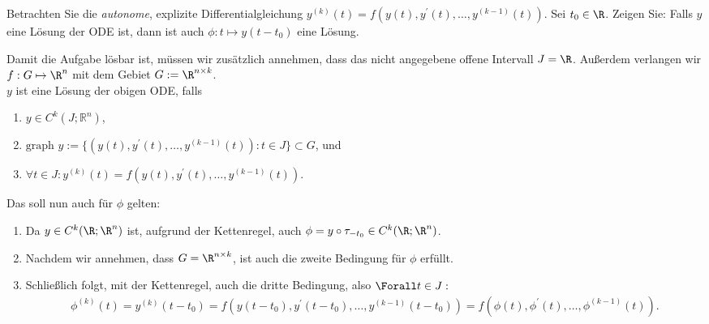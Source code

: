\begin{exercise}

Betrachten Sie die \textit{autonome}, explizite Differentialgleichung $y^{(k)}(t) = f(y(t), y^\prime(t), \ldots, y^{(k-1)}(t))$.
Sei $t_0 \in \R$.
Zeigen Sie:
Falls $y$ eine Lösung der ODE ist, dann ist auch $\phi: t \mapsto y(t - t_0)$ eine Lösung.

\end{exercise}

\begin{solution}

Damit die Aufgabe lösbar ist, müssen wir zusätzlich annehmen, dass das nicht angegebene offene Intervall $J = \R$.
Außerdem verlangen wir $f: G \mapsto \R^n$ mit dem Gebiet $G := \R^{n \times k}$. \\

$y$ ist eine Lösung der obigen ODE, falls

\begin{enumerate}[label = (\roman*)]

  \item $y \in C^k(J;\mathbb{R}^n)$,

  \item $\text{graph~} y := \{(y(t), y^\prime(t), \ldots, y^{(k-1)}(t)): t \in J\} \subset G$, und

  \item $\forall t \in J: y^{(k)}(t) = f(y(t), y^\prime(t), \ldots, y^{(k-1)}(t))$.

\end{enumerate}

Das soll nun auch für $\phi$ gelten:

\begin{enumerate}[label = (\roman*)]

  \item
  Da $y \in C^k(\R; \R^n)$ ist, aufgrund der Kettenregel, auch $\phi = y \circ \tau_{-t_0} \in C^k(\R; \R^n)$.

  \item
  Nachdem wir annehmen, dass $G = \R^{n \times k}$, ist auch die zweite Bedingung für $\phi$ erfüllt.

  \item
  Schließlich folgt, mit der Kettenregel, auch die dritte Bedingung, also $\Forall t \in J:$
  \begin{align*}
    \phi^{(k)}(t)
    =
    y^{(k)}(t-t_0)
    =
    f(y(t- t_0), y^\prime(t - t_0), \ldots, y^{(k-1)}(t-t_0))
    =
    f(\phi(t), \phi^\prime(t), \ldots, \phi^{(k-1)}(t)).
  \end{align*}

\end{enumerate}


\end{solution}
